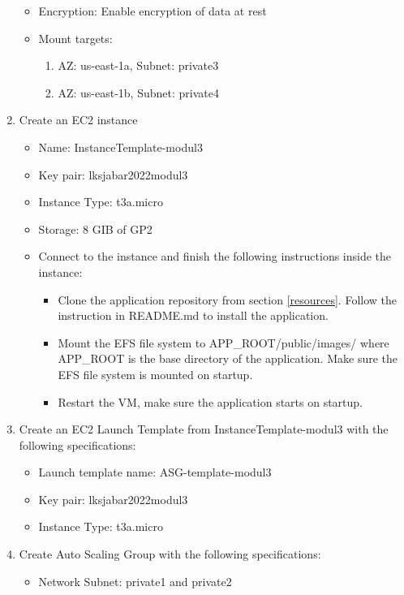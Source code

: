 \documentclass{article}
\begin{document}
\begin{enumerate}
\begin{itemize}
        \item Encryption: Enable encryption of data at rest
        \item Mount targets:
        \begin{enumerate}
            \item AZ: us-east-1a, Subnet: private3
            \item AZ: us-east-1b, Subnet: private4
        \end{enumerate}
    \end{itemize}
    \item Create an EC2 instance
    \begin{itemize}
        \item Name: InstanceTemplate-modul3
        \item Key pair: lksjabar2022modul3
        \item Instance Type: t3a.micro
        \item Storage: 8 GIB of GP2
        \item Connect to the instance and finish the following instructions inside the instance:
        \begin{itemize}
            \item Clone the application repository from section \ref{resources}. Follow the instruction in README.md to install the application.
            \item Mount the EFS file system to APP\_ROOT/public/images/ where APP\_ROOT is the base directory of the application. Make sure the EFS file system is mounted on startup.
            \item Restart the VM, make sure the application starts on startup.
        \end{itemize}
    \end{itemize}
    \item Create an EC2 Launch Template from InstanceTemplate-modul3 with the following specifications:
    \begin{itemize}
        \item Launch template name: ASG-template-modul3
        \item Key pair: lksjabar2022modul3
        \item Instance Type: t3a.micro
    \end{itemize}
    \item Create Auto Scaling Group with the following specifications:
    \begin{itemize}
        \item Network Subnet: private1 and private2

\end{itemize}
\end{enumerate}
\end{document}
